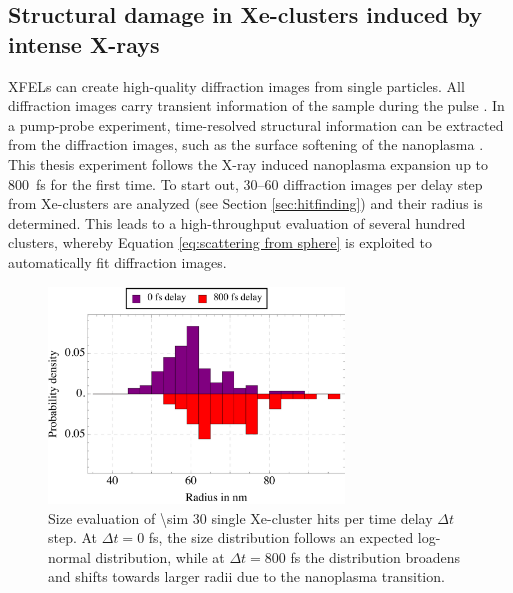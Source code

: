 \subsection{Structural damage in Xe-clusters induced by intense X-rays}\label{sec:xenon-data}
XFELs can create high-quality diffraction images from single particles. All diffraction images carry transient information of the sample during the pulse \cite{Bostedt-2012-PRL}. In a pump-probe experiment, time-resolved structural information can be extracted from the diffraction images, such as the surface softening of the nanoplasma \cite{Gorkhover-2016-NatPho}. This thesis experiment follows the X-ray induced nanoplasma expansion up to \SI{800}{\femto\second} for the first time.
To start out, \numrange{30}{60} diffraction images per delay step from Xe-clusters are analyzed (see Section \ref{sec:hitfinding}) and their radius is determined. This leads to a high-throughput evaluation of several hundred clusters, whereby Equation \eqref{eq:scattering from sphere} is exploited to automatically fit diffraction images.\\[1\baselineskip]
\begin{figure}
	\centering
		\includegraphics[width=0.70\textwidth]{images/results/size-distributions.png}
	\caption[Single Xe-cluster size distribution at varying time delay $\Delta t$.]{Size evaluation of \num{\sim 30} single Xe-cluster hits per time delay $\Delta t$ step. At $\Delta t=0$ fs, the size distribution follows an expected log-normal distribution, while at $\Delta t=800$ fs the distribution broadens and shifts towards larger radii due to the nanoplasma transition.}
	\label{fig:size-distributions}
\end{figure}
